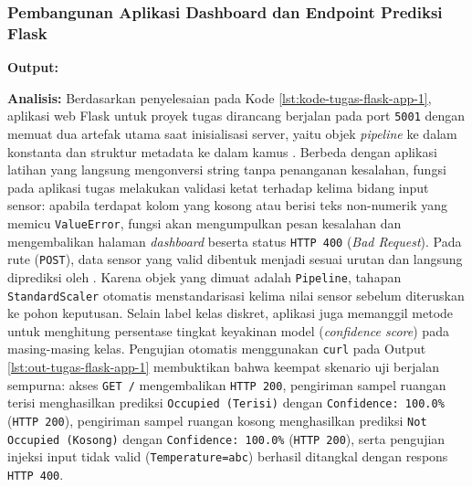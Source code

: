 \documentclass[a4paper,oneside,11pt]{book}
\begin{document}
\subsubsection{Pembangunan Aplikasi Dashboard dan Endpoint Prediksi Flask}

\par \textbf{Output:}

\par \textbf{Analisis:} Berdasarkan penyelesaian pada Kode \ref{lst:kode-tugas-flask-app-1}, aplikasi web Flask untuk proyek tugas dirancang berjalan pada port \texttt{5001} dengan memuat dua artefak utama saat inisialisasi server, yaitu objek \textit{pipeline}  ke dalam konstanta  dan struktur metadata  ke dalam kamus . Berbeda dengan aplikasi latihan yang langsung mengonversi string tanpa penanganan kesalahan, fungsi  pada aplikasi tugas melakukan validasi ketat terhadap kelima bidang input sensor: apabila terdapat kolom yang kosong atau berisi teks non-numerik yang memicu \texttt{ValueError}, fungsi akan mengumpulkan pesan kesalahan dan mengembalikan halaman \textit{dashboard} beserta status \texttt{HTTP 400} (\textit{Bad Request}). Pada rute  (\texttt{POST}), data sensor yang valid dibentuk menjadi  sesuai urutan  dan langsung diprediksi oleh . Karena objek yang dimuat adalah \texttt{Pipeline}, tahapan \texttt{StandardScaler} otomatis menstandarisasi kelima nilai sensor sebelum diteruskan ke pohon keputusan. Selain label kelas diskret, aplikasi juga memanggil metode  untuk menghitung persentase tingkat keyakinan model (\textit{confidence score}) pada masing-masing kelas. Pengujian otomatis menggunakan \texttt{curl} pada Output \ref{lst:out-tugas-flask-app-1} membuktikan bahwa keempat skenario uji berjalan sempurna: akses \texttt{GET /} mengembalikan \texttt{HTTP 200}, pengiriman sampel ruangan terisi menghasilkan prediksi \texttt{Occupied (Terisi)} dengan \texttt{Confidence: 100.0\%} (\texttt{HTTP 200}), pengiriman sampel ruangan kosong menghasilkan prediksi \texttt{Not Occupied (Kosong)} dengan \texttt{Confidence: 100.0\%} (\texttt{HTTP 200}), serta pengujian injeksi input tidak valid (\texttt{Temperature=abc}) berhasil ditangkal dengan respons \texttt{HTTP 400}.
\end{document}
